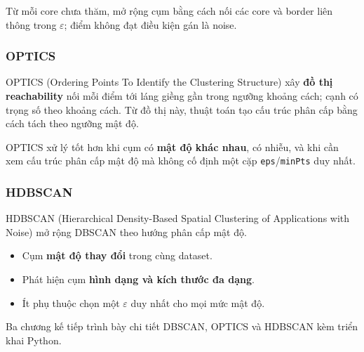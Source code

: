 \begin{phuongphap}[title={Cơ chế tóm tắt}]
Từ mỗi core chưa thăm, mở rộng cụm bằng cách nối các core và border liên thông trong $\varepsilon$; điểm không đạt điều kiện gán là noise.
\end{phuongphap}

\subsubsection{OPTICS}

\begin{dinhnghia}[title={OPTICS}]
OPTICS (Ordering Points To Identify the Clustering Structure) xây \textbf{đồ thị reachability} nối mỗi điểm tới láng giềng gần trong ngưỡng khoảng cách; cạnh có trọng số theo khoảng cách. Từ đồ thị này, thuật toán tạo cấu trúc phân cấp bằng cách tách theo ngưỡng mật độ.
\end{dinhnghia}

\begin{tinhchat}[title={So với DBSCAN}]
OPTICS xử lý tốt hơn khi cụm có \textbf{mật độ khác nhau}, có nhiễu, và khi cần xem cấu trúc phân cấp mật độ mà không cố định một cặp \texttt{eps}/\texttt{minPts} duy nhất.
\end{tinhchat}

\subsubsection{HDBSCAN}

\begin{dinhnghia}[title={HDBSCAN}]
HDBSCAN (Hierarchical Density-Based Spatial Clustering of Applications with Noise) mở rộng DBSCAN theo hướng phân cấp mật độ.
\end{dinhnghia}

\begin{tinhchat}[title={Ưu điểm so với DBSCAN}]
\begin{itemize}
  \item Cụm \textbf{mật độ thay đổi} trong cùng dataset.
  \item Phát hiện cụm \textbf{hình dạng và kích thước đa dạng}.
  \item Ít phụ thuộc chọn một $\varepsilon$ duy nhất cho mọi mức mật độ.
\end{itemize}
\end{tinhchat}

\begin{luuy}[title={Các chương tiếp theo}]
Ba chương kế tiếp trình bày chi tiết DBSCAN, OPTICS và HDBSCAN kèm triển khai Python.
\end{luuy}
